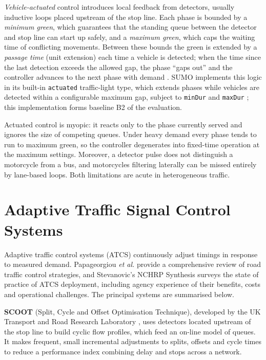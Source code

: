 \emph{Vehicle-actuated} control introduces local feedback from detectors, usually inductive loops placed
upstream of the stop line. Each phase is bounded by a \emph{minimum green}, which guarantees that the standing
queue between the detector and stop line can start up safely, and a \emph{maximum green}, which caps the waiting
time of conflicting movements. Between these bounds the green is extended by a \emph{passage time} (unit
extension) each time a vehicle is detected; when the time since the last detection exceeds the allowed gap, the
phase ``gaps out'' and the controller advances to the next phase with demand \cite{koonce2008timing}. SUMO
implements this logic in its built-in \texttt{actuated} traffic-light type, which extends phases while vehicles
are detected within a configurable maximum gap, subject to \texttt{minDur} and \texttt{maxDur}
\cite{sumo_actuated}; this implementation forms baseline B2 of the evaluation.

Actuated control is myopic: it reacts only to the phase currently served and ignores the size of competing queues.
Under heavy demand every phase tends to run to maximum green, so the controller degenerates into fixed-time
operation at the maximum settings. Moreover, a detector pulse does not distinguish a motorcycle from a bus, and
motorcycles filtering laterally can be missed entirely by lane-based loops. Both limitations are acute in
heterogeneous traffic.

\section{Adaptive Traffic Signal Control Systems}\label{sec:lit-atcs}
Adaptive traffic control systems (ATCS) continuously adjust timings in response to measured demand. Papageorgiou
\emph{et al.} \cite{papageorgiou2003review} provide a comprehensive review of road traffic control strategies,
and Stevanovic's NCHRP Synthesis \cite{stevanovic2010nchrp} surveys the state of practice of ATCS deployment,
including agency experience of their benefits, costs and operational challenges. The principal systems are
summarised below.

\textbf{SCOOT} (Split, Cycle and Offset Optimisation Technique), developed by the UK Transport and Road Research
Laboratory \cite{hunt1981scoot}, uses detectors located upstream of the stop line to build cyclic flow profiles,
which feed an on-line model of queues. It makes frequent, small incremental adjustments to splits, offsets and
cycle times to reduce a performance index combining delay and stops across a network.

